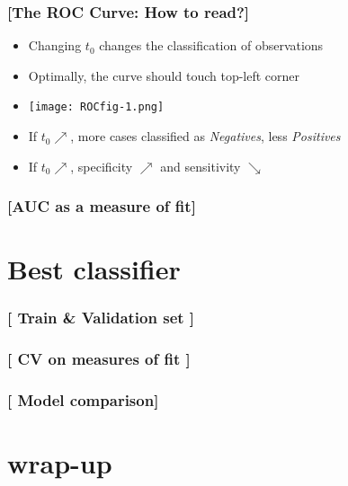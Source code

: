 \documentclass[xcolor=x11names,compress, handhouts]{beamer}
\renewcommand{\(}{\begin{columns}}
\renewcommand{\)}{\end{columns}}
\newcommand{\<}[1]{\begin{column}{#1}}
\renewcommand{\>}{\end{column}}
\begin{document}
\begin{frame} %
\frametitle{\textcolor{brique}{[The ROC Curve: How to read?]}}
\pause
 \begin{itemize}[<+->]
  \item[] Changing $t_0$ changes the classification of observations
  \item  Optimally, the curve should touch top-left corner
  \item[] \begin{center}\texttt{[image: ROCfig-1.png]} \end{center}
  \item If $t_0  \nearrow $,  more cases  classified as \textit{Negatives}, less \textit{Positives}
  \item If $t_0  \nearrow $,   specificity  $\nearrow $ and sensitivity $\searrow$
\end{itemize}
\end{frame}


\begin{frame} %
\frametitle{\textcolor{brique}{[AUC as a measure of fit]}}


\end{frame}


\section{Best classifier}

\begin{frame} %
\frametitle{\textcolor{brique}{[ Train \& Validation set ]}}

\end{frame}

\begin{frame} %
\frametitle{\textcolor{brique}{[ CV on measures of fit ]}}

\end{frame}

\begin{frame} %
\frametitle{\textcolor{brique}{[ Model comparison]}}

\end{frame}




\section{wrap-up}
\end{document}
